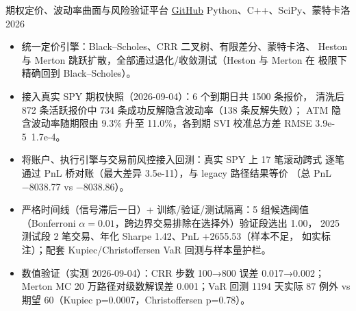 \entry
    {期权定价、波动率曲面与风险验证平台}
    {\href{https://github.com/burger56487/options-volatility-backtester}{GitHub}}
    {Python、C++、SciPy、蒙特卡洛}
    {2026}

\begin{itemize}
    \item 统一定价引擎：Black--Scholes、CRR 二叉树、有限差分、蒙特卡洛、
    Heston 与 Merton 跳跃扩散，全部通过退化/收敛测试（Heston 与 Merton 在
    极限下精确回到 Black--Scholes）。
    \item 接入真实 SPY 期权快照（2026-09-04）：6 个到期日共 1500 条报价，
    清洗后 872 条活跃报价中 734 条成功反解隐含波动率（138 条反解失败）；
    ATM 隐含波动率随期限由 9.3\% 升至 11.0\%，各到期 SVI 校准总方差
    RMSE 3.9e-5~1.7e-4。
    \item 将账户、执行引擎与交易前风控接入回测：真实 SPY 上 17 笔滚动跨式
    逐笔通过 PnL 桥对账（最大差异 3.5e-11），与 legacy 路径结果等价
    （总 PnL −8038.77 vs −8038.86）。
    \item 严格时间线（信号滞后一日）+ 训练/验证/测试隔离：5 组候选阈值
    （Bonferroni $\alpha=0.01$，跨边界交易排除在选择外）验证段选出 1.00，
    2025 测试段 2 笔交易、年化 Sharpe 1.42、PnL +2655.53（样本不足，
    如实标注）；配套 Kupiec/Christoffersen VaR 回测与样本量护栏。
    \item 数值验证（实测 2026-09-04）：CRR 步数 100→800 误差 0.017→0.002；
    Merton MC 20 万路径对级数解误差 0.001；VaR 回测 1194 天实际 87 例外 vs
    期望 60（Kupiec p=0.0007，Christoffersen p=0.78）。
\end{itemize}


